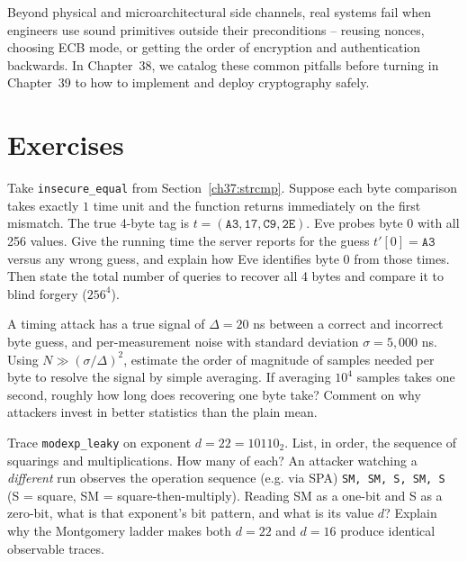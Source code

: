 Beyond physical and microarchitectural side channels, real systems fail when engineers use sound primitives outside their preconditions -- reusing nonces, choosing ECB mode, or getting the order of encryption and authentication backwards. In Chapter~38, we catalog these common pitfalls before turning in Chapter~39 to how to implement and deploy cryptography safely.

\section*{Exercises}
\label{ch37:exercises}

\begin{exercise}
\label{ch37:ex-strcmp}
Take \texttt{insecure\_equal} from Section~\ref{ch37:strcmp}. Suppose each byte comparison takes exactly $1$ time unit and the function returns immediately on the first mismatch. The true 4-byte tag is $t = (\texttt{A3}, \texttt{17}, \texttt{C9}, \texttt{2E})$. Eve probes byte 0 with all 256 values. Give the running time the server reports for the guess $t'[0] = \texttt{A3}$ versus any wrong guess, and explain how Eve identifies byte 0 from those times. Then state the total number of queries to recover all 4 bytes and compare it to blind forgery ($256^{4}$).
\end{exercise}

\begin{exercise}
\label{ch37:ex-noise}
A timing attack has a true signal of $\Delta = 20$ ns between a correct and incorrect byte guess, and per-measurement noise with standard deviation $\sigma = 5{,}000$ ns. Using $N \gg (\sigma/\Delta)^2$, estimate the order of magnitude of samples needed per byte to resolve the signal by simple averaging. If averaging $10^{4}$ samples takes one second, roughly how long does recovering one byte take? Comment on why attackers invest in better statistics than the plain mean.
\end{exercise}

\begin{exercise}
\label{ch37:ex-sqmul}
Trace \texttt{modexp\_leaky} on exponent $d = 22 = 10110_2$. List, in order, the sequence of squarings and multiplications. How many of each? An attacker watching a \emph{different} run observes the operation sequence (e.g. via SPA) \texttt{SM, SM, S, SM, S} (S = square, SM = square-then-multiply). Reading SM as a one-bit and S as a zero-bit, what is that exponent's bit pattern, and what is its value $d$? Explain why the Montgomery ladder makes both $d=22$ and $d=16$ produce identical observable traces.
\end{exercise}

